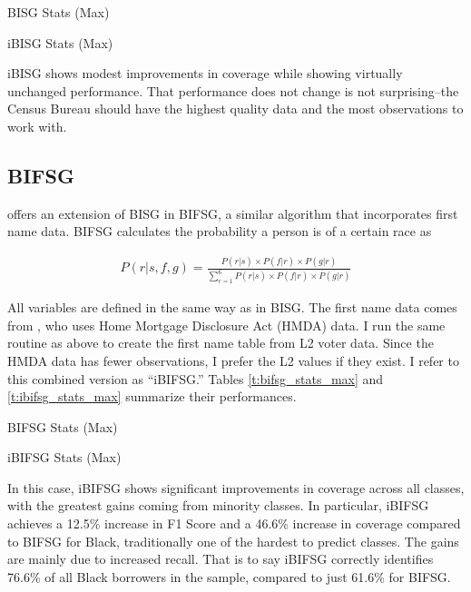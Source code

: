 \documentclass[12pt]{article}
\begin{document}
\begin{table}[H]
    \caption{BISG Stats (Max)}
    \label{t:bisg_stats_max}
    \centering
    
\end{table}

\begin{table}[H]
    \caption{iBISG Stats (Max)}
    \label{t:ibisg_stats_max}
    \centering
    
\end{table}

iBISG shows modest improvements in coverage while showing virtually unchanged performance. That performance does not change is not surprising--the Census Bureau should have the highest quality data and the most observations to work with.

\subsection{BIFSG} \label{subsec:bifsg}

\cite{voicu2018} offers an extension of BISG in BIFSG, a similar algorithm that incorporates first name data. BIFSG calculates the probability a person is of a certain race as

\begin{align*}
    P(r | s, f, g) = \frac{P(r | s) \times P(f | r) \times P(g | r)}{\sum_{r=1}^{6} P(r | s) \times P(f | r) \times P(g | r)}
\end{align*}

All variables are defined in the same way as in BISG. The first name data comes from \cite{tzioumis2018}, who uses Home Mortgage Disclosure Act (HMDA) data. I run the same routine as above to create the first name table from L2 voter data. Since the HMDA data has fewer observations, I prefer the L2 values if they exist. I refer to this combined version as ``iBIFSG.'' Tables \ref{t:bifsg_stats_max} and \ref{t:ibifsg_stats_max} summarize their performances.


\begin{table}[H]
    \caption{BIFSG Stats (Max)}
    \label{t:bifsg_stats_max}
    \centering
    
\end{table}

\begin{table}[H]
    \caption{iBIFSG Stats (Max)}
    \label{t:ibifsg_stats_max}
    \centering
    
\end{table}

In this case, iBIFSG shows significant improvements in coverage across all classes, with the greatest gains coming from minority classes. In particular, iBIFSG achieves a 12.5\% increase in F1 Score and a 46.6\% increase in coverage compared to BIFSG for Black, traditionally one of the hardest to predict classes. The gains are mainly due to increased recall. That is to say iBIFSG correctly identifies 76.6\% of all Black borrowers in the sample, compared to just 61.6\% for BIFSG.
\end{document}
